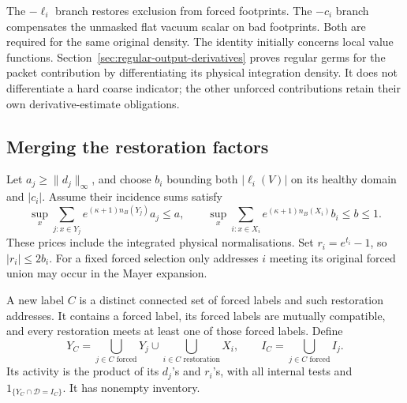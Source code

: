 \documentclass[11pt,reqno]{amsart}
\numberwithin{equation}{section}
\theoremstyle{definition}
\theoremstyle{remark}
\begin{document}
The \(-\ell_i\) branch restores exclusion from forced footprints.
The \(-c_i\) branch compensates the unmasked flat vacuum scalar
on bad footprints. Both are required for the same original
density. The identity initially concerns local value functions.
Section~\ref{sec:regular-output-derivatives} proves regular
germs for the packet contribution by differentiating its physical
integration density. It does not differentiate a hard coarse
indicator; the other unforced contributions retain their own
derivative-estimate obligations.

\subsection{Merging the restoration factors}

Let \(a_j\ge\|d_j\|_\infty\), and choose \(b_i\) bounding
both \(|\ell_i(V)|\) on its healthy domain and \(|c_i|\).
Assume their incidence sums satisfy
\[
 \sup_x\sum_{j:x\in Y_j}e^{(\kappa+1)n_B(Y_j)}a_j\le a,
 \qquad
 \sup_x\sum_{i:x\in X_i}e^{(\kappa+1)n_B(X_i)}b_i\le b\le1.
\]
These prices include the integrated physical normalisations.
Set \(r_i=e^{t_i}-1\), so \(|r_i|\le2b_i\).
For a fixed forced selection only addresses \(i\) meeting its
original forced union may occur in the Mayer expansion.

A new label \(C\) is a distinct connected set of forced labels
and such restoration addresses. It contains a forced label,
its forced labels are mutually compatible, and every restoration
meets at least one of those forced labels. Define
\[
 Y_C=\bigcup_{j\in C\text{ forced}}Y_j
                    \cup\bigcup_{i\in C\text{ restoration}}X_i,
 \qquad I_C=\bigcup_{j\in C\text{ forced}}I_j.
\]
Its activity is the product of its \(d_j\)'s and \(r_i\)'s,
with all internal tests and
\(1_{\{Y_C\cap\mathcal D=I_C\}}\). It has nonempty inventory.
\end{document}
